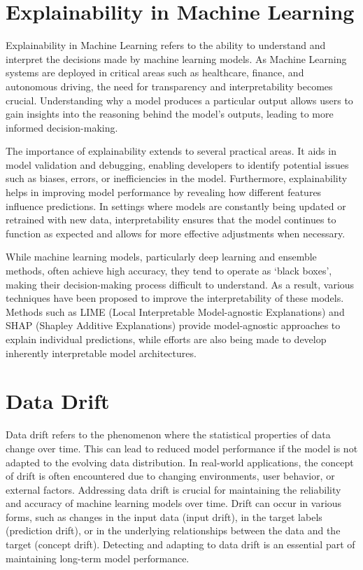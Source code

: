 \section{Explainability in Machine Learning}\label{sec:explainability}
Explainability in Machine Learning refers to the ability to understand and
interpret the decisions made by machine learning models. As Machine Learning
systems are deployed in critical areas such as healthcare, finance, and
autonomous driving, the need for transparency and interpretability becomes
crucial. Understanding why a model produces a particular output allows users to
gain insights into the reasoning behind the model's outputs, leading to
more informed decision-making.

The importance of explainability extends to several practical areas. It aids in
model validation and debugging, enabling developers to identify potential
issues such as biases, errors, or inefficiencies in the model. Furthermore,
explainability helps in improving model performance by revealing how different
features influence predictions. In settings where models are constantly being
updated or retrained with new data, interpretability ensures that the model
continues to function as expected and allows for more effective adjustments
when necessary.

While machine learning models, particularly deep learning and ensemble methods,
often achieve high accuracy, they tend to operate as `black boxes', making
their decision-making process difficult to understand. As a result, various
techniques have been proposed to improve the interpretability of these models.
Methods such as LIME (Local Interpretable Model-agnostic Explanations) and SHAP
(Shapley Additive Explanations) provide model-agnostic approaches to explain
individual predictions, while efforts are also being made to develop inherently
interpretable model architectures.

\section{Data Drift}\label{sec:data_drift}
Data drift refers to the phenomenon where the statistical properties of data
change over time. This can lead to reduced model performance if the model is
not adapted to the evolving data distribution. In real-world applications, the
concept of drift is often encountered due to changing environments, user
behavior, or external factors. Addressing data drift is crucial for maintaining
the reliability and accuracy of machine learning models over time. Drift can
occur in various forms, such as changes in the input data (input drift), in the
target labels (prediction drift), or in the underlying relationships between
the data and the target (concept drift). Detecting and adapting to data drift
is an essential part of maintaining long-term model performance.

